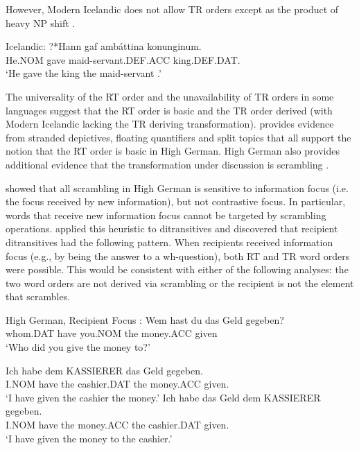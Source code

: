 	However, Modern Icelandic does not allow TR orders except as the product of heavy NP shift \citep{Dehe.2004}.

\begin{exe}
	\ex Icelandic:\label{ex:ice-tr}
\gll ?*Hann gaf amb\'attina konunginum.\\
He.NOM gave maid-servant.DEF.ACC king.DEF.DAT. \\
\trans `He gave the king the maid-servant \citep[ex 14b]{Dehe.2004}.'
\end{exe}

The universality of the RT order and the unavailability of TR orders in some languages suggest that the RT order is basic and the TR order derived (with Modern Icelandic lacking the TR deriving transformation). \cite{Georgala.2011} provides evidence from stranded depictives, floating quantifiers and split topics that all support the notion that the RT order is basic in High German. High German also provides additional evidence that the transformation under discussion is scrambling \citep{Lenerz.1977,Abraham.1986,Webelhuth.1992,Choi.1996}.

\cite{Lenerz.1977} showed that all scrambling in High German is sensitive to information focus (i.e. the focus received by new information), but not contrastive focus. In particular, words that receive new information focus cannot be targeted by scrambling operations. \cite{Lenerz.1977} applied this heuristic to ditransitives and discovered that recipient ditransitives had the following pattern. When recipients received information focus (e.g., by being the answer to a wh-question), both RT and TR word orders were possible. This would be consistent with either of the following analyses: the two word orders are not derived via scrambling or the recipient is not the element that scrambles.

\begin{exe}
	\ex High German, Recipient Focus \citep{Choi.1996}:\label{ex:hg-rec-focus}
\gll Wem hast du das Geld gegeben?\\
whom.DAT have you.NOM the money.ACC given\\
\trans `Who did you give the money to?'
\begin{xlist}
\ex \gll Ich habe dem KASSIERER das Geld gegeben.\\
I.NOM have the cashier.DAT the money.ACC given.\\
\trans `I have given the cashier the money.'
\ex \gll Ich habe das Geld dem KASSIERER gegeben.\\
I.NOM have the money.ACC the cashier.DAT given.\\
\trans `I have given the money to the cashier.'
\end{xlist}
\end{exe}

